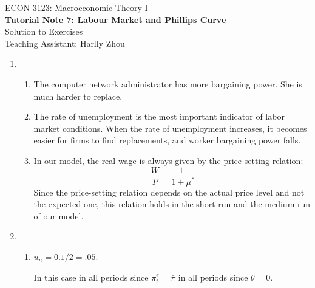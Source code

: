 \documentclass[12pt]{article}
\begin{document}
\begin{center}
    ECON 3123: Macroeconomic Theory I\\
    {\large \textbf{Tutorial Note 7: Labour Market and Phillips Curve}}\\
    Solution to Exercises\\
    Teaching Assistant: Harlly Zhou
\end{center}

\begin{enumerate}[label=\arabic*.]
    \item \begin{enumerate}[label=(\alph*)]
        \item The computer network administrator has more bargaining power. She is much harder to replace.
        \item The rate of unemployment is the most important indicator of labor market conditions. When the rate of unemployment increases, it becomes easier for firms to find replacements, and worker bargaining power falls.
        \item In our model, the real wage is always given by the price-setting relation: 
        \[\frac{W}{P} = \frac{1}{1+\mu}.\]
        Since the price-setting relation depends on the actual price level and not the expected one, this relation holds in the short run and the medium run of our model.
    \end{enumerate}
    \item \begin{enumerate}[label=(\alph*)]
        \item $u_n=0.1/2=.05$.
        
        In this case in all periods since $\pi_t^e = \bar{\pi}$ in all periods since $\theta=0$.


\end{enumerate}
\end{enumerate}
\end{document}
